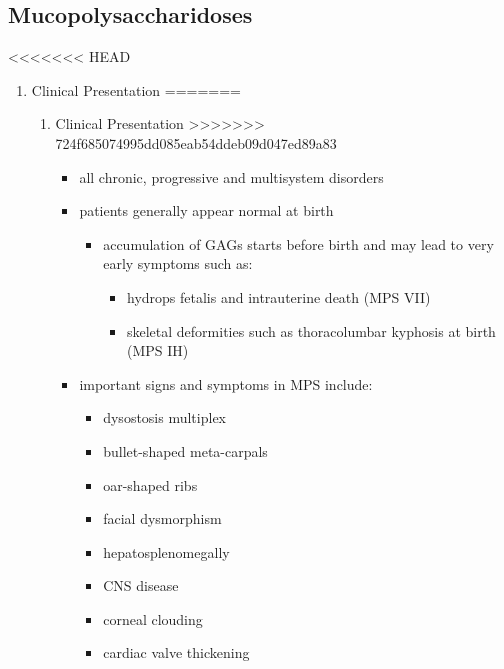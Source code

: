 \documentclass[fontsize=12pt]{scrartcl}
\begin{document}
\begin{enumerate}
\begin{enumerate}
\begin{enumerate}
\begin{enumerate}
\begin{table}[htbp]
\begin{enumerate}
\begin{enumerate}
\begin{enumerate}
\subsection{Mucopolysaccharidoses}
<<<<<<< HEAD
\label{sec:org1197faf}
\begin{enumerate}
\item Clinical Presentation
\label{sec:org97059c5}
=======
\label{sec:orgc71219b}
\begin{enumerate}
\item Clinical Presentation
\label{sec:orgc94b4da}
>>>>>>> 724f685074995dd085eab54ddeb09d047ed89a83
\begin{itemize}
\item all chronic, progressive and multisystem disorders
\item patients generally appear normal at birth
\begin{itemize}
\item accumulation of GAGs starts before birth and may lead to very
early symptoms such as:
\begin{itemize}
\item hydrops fetalis and intrauterine death (MPS VII)
\item skeletal deformities such as thoracolumbar kyphosis at birth (MPS IH)
\end{itemize}
\end{itemize}

\item important signs and symptoms in MPS include:
\begin{itemize}
\item dysostosis multiplex
\item bullet-shaped meta-carpals
\item oar-shaped ribs
\item facial dysmorphism
\item hepatosplenomegally
\item CNS disease
\item corneal clouding
\item cardiac valve thickening
\end{itemize}
\end{itemize}


\end{enumerate}
\end{enumerate}
\end{enumerate}
\end{enumerate}
\end{enumerate}
\end{table}
\end{enumerate}
\end{enumerate}
\end{enumerate}
\end{enumerate}
\end{document}
